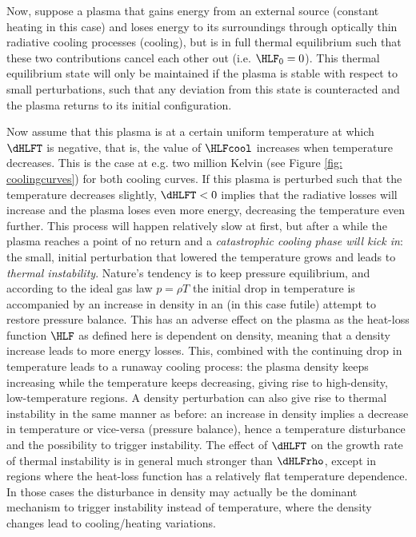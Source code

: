 Now, suppose a plasma that gains energy from an external source (constant heating in this case) and loses energy to its surroundings through optically thin radiative cooling processes (cooling), but is in full thermal equilibrium such that these two contributions cancel each other out (i.e. $\HLF_0 = 0$). This thermal equilibrium state will only be maintained if the plasma is stable with respect to small perturbations, such that any deviation from this state is counteracted and the plasma returns to its initial configuration.

Now assume that this plasma is at a certain uniform temperature at which $\dHLFT$ is negative, that is, the value of $\HLFcool$ increases when temperature decreases. This is the case at e.g. two million Kelvin (see Figure \ref{fig: coolingcurves}) for both cooling curves. If this plasma is perturbed such that the temperature decreases slightly, $\dHLFT < 0$ implies that the radiative losses will increase and the plasma loses even more energy, decreasing the temperature even further. This process will happen relatively slow at first, but after a while the plasma reaches a point of no return and a \emph{catastrophic cooling phase will kick in}: the small, initial perturbation that lowered the temperature grows and leads to \emph{thermal instability}. Nature's tendency is to keep pressure equilibrium, and according to the ideal gas law $p = \rho T$ the initial drop in temperature is accompanied by an increase in density in an (in this case futile) attempt to restore pressure balance. This has an adverse effect on the plasma as the heat-loss function $\HLF$ as defined here is dependent on density, meaning that a density increase leads to more energy losses. This, combined with the continuing drop in temperature leads to a runaway cooling process: the plasma density keeps increasing while the temperature keeps decreasing, giving rise to high-density, low-temperature regions.
A density perturbation can also give rise to thermal instability in the same manner as before: an increase in density implies a decrease in temperature or vice-versa (pressure balance), hence a temperature disturbance and the possibility to trigger instability. The effect of $\dHLFT$ on the growth rate of thermal instability is in general much stronger than $\dHLFrho$, except in regions where the heat-loss function has a relatively flat temperature dependence. In those cases the disturbance in density may actually be the dominant mechanism to trigger instability instead of temperature, where the density changes lead to cooling/heating variations.

